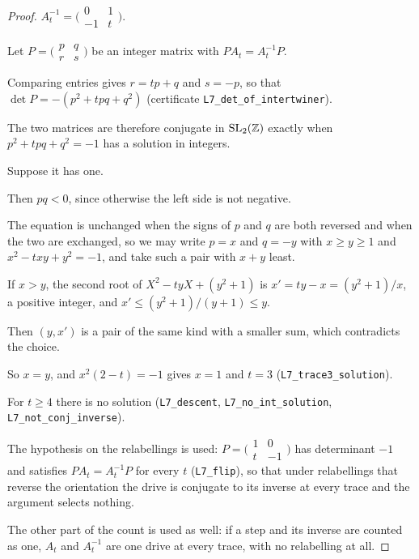 \documentclass[11pt,a4paper]{article}
\theoremstyle{plain}
\theoremstyle{definition}
\theoremstyle{remark}
\begin{document}
\begin{proof}
$A_{t}^{-1}=\bigl(\begin{smallmatrix}0&1\\-1&t\end{smallmatrix}\bigr)$.

Let $P=\bigl(\begin{smallmatrix}p&q\\r&s\end{smallmatrix}\bigr)$ be an integer matrix with $PA_{t}=A_{t}^{-1}P$.

Comparing entries gives $r=tp+q$ and $s=-p$, so that $\det P=-(p^{2}+tpq+q^{2})$ (certificate \texttt{L7\_det\_of\_intertwiner}).

The two matrices are therefore conjugate in $\mathrm{SL}_{2}(\mathbb{Z})$ exactly when $p^{2}+tpq+q^{2}=-1$ has a solution in integers.

Suppose it has one.

Then $pq<0$, since otherwise the left side is not negative.

The equation is unchanged when the signs of $p$ and $q$ are both reversed and when the two are exchanged, so we may write $p=x$ and $q=-y$ with $x\geq y\geq1$ and $x^{2}-txy+y^{2}=-1$, and take such a pair with $x+y$ least.

If $x>y$, the second root of $X^{2}-tyX+(y^{2}+1)$ is $x'=ty-x=(y^{2}+1)/x$, a positive integer, and $x'\leq(y^{2}+1)/(y+1)\leq y$.

Then $(y,x')$ is a pair of the same kind with a smaller sum, which contradicts the choice.

So $x=y$, and $x^{2}(2-t)=-1$ gives $x=1$ and $t=3$ (\texttt{L7\_trace3\_solution}).

For $t\geq4$ there is no solution (\texttt{L7\_descent}, \texttt{L7\_no\_int\_solution}, \texttt{L7\_not\_conj\_inverse}).

The hypothesis on the relabellings is used: $P=\bigl(\begin{smallmatrix}1&0\\t&-1\end{smallmatrix}\bigr)$ has determinant $-1$ and satisfies $PA_{t}=A_{t}^{-1}P$ for every $t$ (\texttt{L7\_flip}), so that under relabellings that reverse the orientation the drive is conjugate to its inverse at every trace and the argument selects nothing.

The other part of the count is used as well: if a step and its inverse are counted as one, $A_{t}$ and $A_{t}^{-1}$ are one drive at every trace, with no relabelling at all.
\end{proof}
\end{document}
